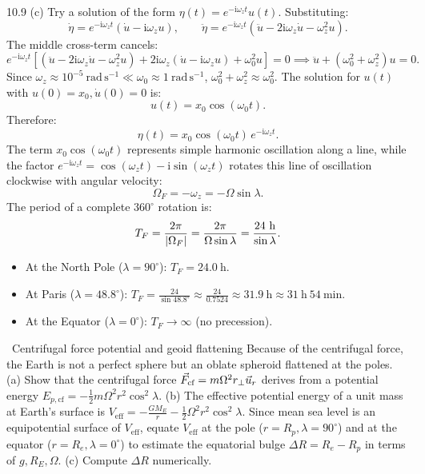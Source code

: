 \begin{solution}{10.9}
(c) Try a solution of the form $\eta(t) = e^{-\mathrm{i}\omega_z t} u(t)$. Substituting:
\[
\dot{\eta} = e^{-\mathrm{i}\omega_z t}(\dot{u} - \mathrm{i}\omega_z u),\qquad \ddot{\eta} = e^{-\mathrm{i}\omega_z t}(\ddot{u} - 2\mathrm{i}\omega_z\dot{u} - \omega_z^2 u).
\]
The middle cross-term cancels:
\[
e^{-\mathrm{i}\omega_z t}\left[ (\ddot{u} - 2\mathrm{i}\omega_z\dot{u} - \omega_z^2 u) + 2\mathrm{i}\omega_z(\dot{u} - \mathrm{i}\omega_z u) + \omega_0^2 u \right] = 0 \implies \ddot{u} + (\omega_0^2 + \omega_z^2)u = 0.
\]
Since $\omega_z \approx 10^{-5}\ \mathrm{rad\,s^{-1}} \ll \omega_0 \approx 1\ \mathrm{rad\,s^{-1}}$, $\omega_0^2 + \omega_z^2 \approx \omega_0^2$.
The solution for $u(t)$ with $u(0)=x_0, \dot{u}(0)=0$ is:
\[
u(t) = x_0\cos(\omega_0 t).
\]
Therefore:
\[
\boxed{\eta(t) = x_0\cos(\omega_0 t)\,e^{-\mathrm{i}\omega_z t}.}
\]
The term $x_0\cos(\omega_0 t)$ represents simple harmonic oscillation along a line, while the factor $e^{-\mathrm{i}\omega_z t} = \cos(\omega_z t) - \mathrm{i}\sin(\omega_z t)$ rotates this line of oscillation clockwise with angular velocity:
\[
\Omega_F = -\omega_z = -\Omega\sin\lambda.
\]
The period of a complete $360^\circ$ rotation is:
\[
T_F = \frac{2\pi}{\abs{\Omega_F}} = \frac{2\pi}{\Omega\sin\lambda} = \frac{24\ \mathrm{h}}{\sin\lambda}.
\]
\begin{itemize}[leftmargin=1.4em,itemsep=2pt]
  \item At the North Pole ($\lambda = 90^\circ$): $T_F = 24.0\ \mathrm{h}$.
  \item At Paris ($\lambda = 48.8^\circ$): $T_F = \frac{24}{\sin 48.8^\circ} \approx \frac{24}{0.7524} \approx 31.9\ \mathrm{h} \approx 31\ \mathrm{h}\ 54\ \mathrm{min}$.
  \item At the Equator ($\lambda = 0^\circ$): $T_F \to \infty$ (no precession).
\end{itemize}
\end{solution}

\begin{exercise}{\mastery\ Centrifugal force potential and geoid flattening}
Because of the centrifugal force, the Earth is not a perfect sphere but an oblate spheroid flattened at the poles.
(a) Show that the centrifugal force $\vec{F}_{\text{cf}} = m\Omega^2 r_\perp\vec{u}_r$ derives from a potential energy $E_{p, \text{cf}} = -\frac{1}{2}m\Omega^2 r^2\cos^2\lambda$.
(b) The effective potential energy of a unit mass at Earth's surface is $V_{\text{eff}} = -\frac{GM_E}{r} - \frac{1}{2}\Omega^2 r^2\cos^2\lambda$. Since mean sea level is an equipotential surface of $V_{\text{eff}}$, equate $V_{\text{eff}}$ at the pole ($r=R_p, \lambda=90^\circ$) and at the equator ($r=R_e, \lambda=0^\circ$) to estimate the equatorial bulge $\Delta R = R_e - R_p$ in terms of $g, R_E, \Omega$.
(c) Compute $\Delta R$ numerically.
\end{exercise}

